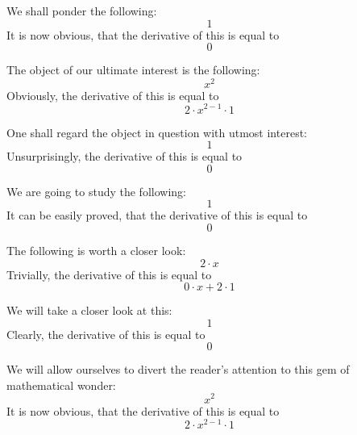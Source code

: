 \documentclass{article}
\begin{document}
We shall ponder the following:
\begin{equation}
1 
\end{equation}
It is now obvious, that the derivative of this is equal to
\begin{equation}
0 
\end{equation}

The object of our ultimate interest is the following:
\begin{equation}
x ^{2 } 
\end{equation}
Obviously, the derivative of this is equal to
\begin{equation}
2 \cdot x ^{2 - 1 } \cdot 1 
\end{equation}

One shall regard the object in question with utmost interest:
\begin{equation}
1 
\end{equation}
Unsurprisingly, the derivative of this is equal to
\begin{equation}
0 
\end{equation}

We are going to study the following:
\begin{equation}
1 
\end{equation}
It can be easily proved, that the derivative of this is equal to
\begin{equation}
0 
\end{equation}

The following is worth a closer look:
\begin{equation}
2 \cdot x 
\end{equation}
Trivially, the derivative of this is equal to
\begin{equation}
0 \cdot x + 2 \cdot 1 
\end{equation}

We will take a closer look at this:
\begin{equation}
1 
\end{equation}
Clearly, the derivative of this is equal to
\begin{equation}
0 
\end{equation}

We will allow ourselves to divert the reader's attention to this gem of mathematical wonder:
\begin{equation}
x ^{2 } 
\end{equation}
It is now obvious, that the derivative of this is equal to
\begin{equation}
2 \cdot x ^{2 - 1 } \cdot 1 
\end{equation}
\end{document}
